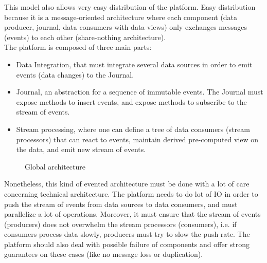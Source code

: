 This model also allows very easy distribution of the platform. Easy distribution because it is a message-oriented
architecture where each component (data producer, journal, data consumers with data views) only exchanges messages (events) to each other (share-nothing architecture).
\\

The platform is composed of three main parts: 
\begin{itemize}
  \item Data Integration, that must integrate several data sources in order to emit 
events (data changes) to the Journal. 
  \item Journal, an abstraction for a sequence of immutable events. The Journal must expose methods to insert events,
  and expose methods to subscribe to the stream of events.
  \item Stream processing, where one can define a tree of data consumers (stream processors) that can react to
  events, maintain derived pre-computed view on the data, and emit new stream of events.
\end{itemize}

\begin{figure}[h]
  \begin{center}
    \caption{Global architecture}
    \label{fig:main_archi}
  \end{center}
\end{figure}

Nonetheless, this kind of evented architecture must be done with a lot of care concerning technical architecture.
The platform needs to do lot of IO in order to push the stream of events from data sources to data consumers, and must
parallelize a lot of operations. Moreover, it must ensure that the stream of events (producers) does not overwhelm the stream
processors (consumers), i.e. if consumers process data slowly, producers must try to slow the push rate. The platform should also deal with possible
failure of components and offer strong guarantees on these cases (like no message loss or duplication).


